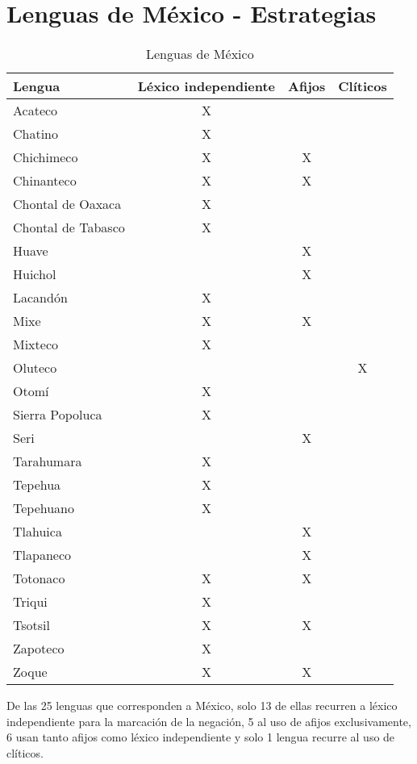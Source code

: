 \section*{Lenguas de México - Estrategias}

\begin{table}[h]
\centering
\begin{tabular}{lccc}
\textbf{Lengua} & \textbf{Léxico independiente} & \textbf{Afijos} & \textbf{Clíticos} \\
\hline
Acateco & X     &       &  \\
Chatino & X     &       &  \\
Chichimeco & X     & X     &  \\
Chinanteco & X     & X     &  \\
Chontal de Oaxaca & X     &       &  \\
Chontal de Tabasco & X     &       &  \\
Huave &       & X     &  \\
Huichol &       & X     &  \\
Lacandón & X     &       &  \\
Mixe  & X     & X     &  \\
Mixteco & X     &       &  \\
Oluteco &       &       & X \\
Otomí & X     &       &  \\
Sierra Popoluca & X     &       &  \\
Seri  &       & X     &  \\
Tarahumara & X     &       &  \\
Tepehua & X     &       &  \\
Tepehuano & X     &       &  \\
Tlahuica &       & X     &  \\
Tlapaneco &       & X     &  \\
Totonaco & X     & X     &  \\
Triqui & X     &       &  \\
Tsotsil & X     & X     &  \\
Zapoteco & X     &       &  \\
Zoque & X     & X     &  \\
\hline
\end{tabular}
\caption{Lenguas de México}
\label{cuadro1}
\end{table}
  
\noindent De las 25 lenguas que corresponden a México, solo 13 de ellas recurren a léxico independiente para la marcación de la negación, 5 al uso de afijos exclusivamente, 6 usan tanto afijos como léxico independiente y solo 1 lengua recurre al uso de clíticos.

